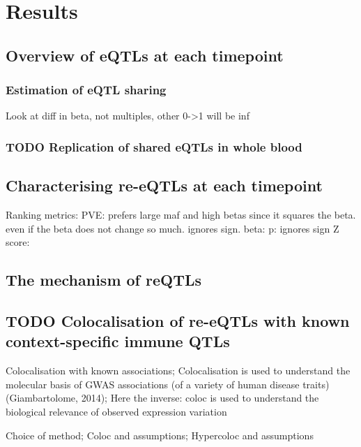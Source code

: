 \section{Results}

\subsection{Overview of eQTLs at each timepoint}


\subsubsection{Estimation of eQTL sharing}


Look at diff in beta, not multiples, other 0->1 will be inf

\subsubsection{TODO Replication of shared eQTLs in whole blood}

\subsection{Characterising re-eQTLs at each timepoint}

Ranking metrics:
PVE: prefers large maf and high betas since it squares the beta. even if the beta does not change so much. ignores sign.
beta: 
p: ignores sign
Z score: 

\subsection{The mechanism of reQTLs}

\subsection{TODO Colocalisation of re-eQTLs with known context-specific immune QTLs}

Colocalisation with known associations;
Colocalisation is used to understand the molecular basis of GWAS associations (of a variety of human disease traits) (Giambartolome, 2014);
Here the inverse: coloc is used to understand the biological relevance of observed expression variation

Choice of method; 
Coloc and assumptions; Hypercoloc and assumptions



